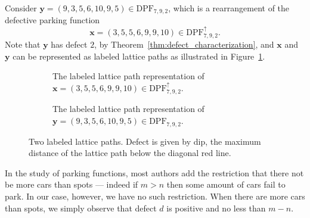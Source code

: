 \documentclass[11pt,reqno]{BICA}
\theoremstyle{definition}
\newcommand{\NDDPF}{\mathrm{DPF}^\uparrow}
\newcommand{\DPF}{\mathrm{DPF}}
\newcommand{\x}{\mathbf{x}}
\newcommand{\y}{\mathbf{y}}
\begin{document}
\begin{example}
    Consider $\y = (9,3,5,6,10,9,5) \in \DPF_{7,9,2}$, which is a rearrangement of the defective parking function \[\x = (3,5,5,6,9,9,10) \in \NDDPF_{7,9,2}.\] 
    Note that $\y$ has defect $2$, by Theorem~\ref{thm:defect_characterization}, and $\x$ and $\y$ can be represented as labeled lattice paths as illustrated in Figure~\ref{fig:labeled-paths}.
    \begin{figure}[h!]\begin{subfigure}{0.5\linewidth}\caption{The labeled lattice path representation of $\x = (3,5,5,6,9,9,10) \in \NDDPF_{7,9,2}$.}\end{subfigure}
    \begin{subfigure}{0.5\linewidth}\caption{The labeled lattice path representation of $\y = (9,3,5,6,10,9,5) \in \DPF_{7,9,2}$.}\end{subfigure}\caption{Two labeled lattice paths. Defect is given by dip, the maximum distance of the lattice path below the diagonal red line.}\label{fig:labeled-paths} \end{figure}
\end{example}

\begin{remark}
    In the study of parking functions, most authors add the restriction that there not be more cars than spots --- indeed if $m > n$ then some amount of cars fail to park. In our case, however, we have no such restriction. When there are more cars than spots, we simply observe that defect $d$ is positive and no less than $m - n$. 
\end{remark}
\end{document}
